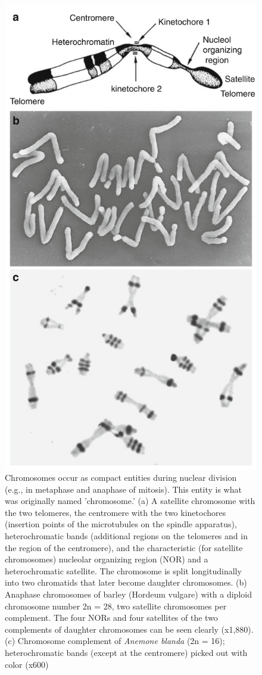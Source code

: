 \documentclass[11pt,dvipsnames,ignorenonframetext,aspectratio=169]{beamer}
\begin{document}
\begin{frame}{}
\protect\hypertarget{section-4}{}
\begin{figure}
\includegraphics[width=0.22\linewidth]{../images/chromosome_structure} \caption{Chromosomes occur as compact entities during nuclear division (e.g., in metaphase and anaphase of mitosis). This entity is what was originally named 'chromosome.' (a) A satellite chromosome with the two telomeres, the centromere with the two kinetochores (insertion points of the microtubules on the spindle apparatus), heterochromatic bands (additional regions on the telomeres and in the region of the centromere), and the characteristic (for satellite chromosomes) nucleolar organizing region (NOR) and a heterochromatic satellite. The chromosome is split longitudinally into two chromatids that later become daughter chromosomes. (b) Anaphase chromosomes of barley (Hordeum vulgare) with a diploid chromosome number 2n = 28, two satellite chromosomes per complement. The four NORs and four satellites of the two complements of daughter chromosomes can be seen clearly (x1,880). (c) Chromosome complement of \textit{Anemone blanda} (2n = 16); heterochromatic bands (except at the centromere) picked out with color (x600)}\label{fig:chromosome-structure}
\end{figure}
\end{frame}
\end{document}
